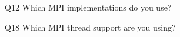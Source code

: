 \begin{description}%
\item{Q12} Which MPI implementations do you use?%
\item{Q18} Which MPI thread support are you using?%
\end{description}%
